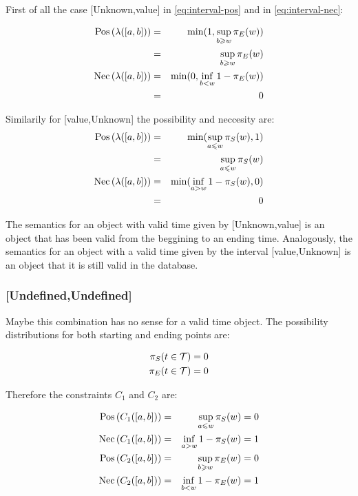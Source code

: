 First of all the case [Unknown,value] in \eqref{eq:interval-pos} and in \eqref{eq:interval-nec}:

\begin{eqnarray}
\operatorname{Pos}\left(\lambda([a,b])\right)&=&\min (1,\sup_{b\geqslant w}\pi_{E}(w))\\
 &=& \sup_{b\geqslant w}\pi_{E}(w)\\
\operatorname{Nec}\left(\lambda([a,b])\right)&=&\min (0,\inf_{b<w}1-\pi_{E}(w))\\
&=& 0
\end{eqnarray}

Similarily for [value,Unknown] the possibility and neccesity are:
\begin{eqnarray}
\operatorname{Pos}\left(\lambda([a,b])\right)&=&\min (\sup_{a\leqslant w}\pi_{S}(w),1)\\
 &=& \sup_{a\leqslant w}\pi_{S}(w)\\
\operatorname{Nec}\left(\lambda([a,b])\right)&=&\min (\inf_{a>w}1-\pi_{S}(w),0)\\
&=& 0
\end{eqnarray}

The semantics for an object with valid time given by [Unknown,value] is an object that has been valid from the beggining to an ending time. Analogously, the semantics for an object with a valid time given by the interval [value,Unknown] is an object that it is still valid in the database. 


\subsubsection{[Undefined,Undefined]}
Maybe this combination has no sense for a valid time object. The possibility distributions for both starting and ending points are:

\begin{eqnarray}
\pi_{S}(t \in \mathcal{T}) = 0\\
\pi_{E}(t \in \mathcal{T}) = 0
\end{eqnarray}

Therefore the constraints $C_1$ and $C_2$ are:

\begin{eqnarray}
\operatorname{Pos}\left(C_1([a,b])\right) &=& \sup_{a\leqslant w}\pi_{S}(w) = 0\\
\operatorname{Nec}\left(C_1([a,b])\right) &=& \inf_{a>w}1-\pi_{S}(w) = 1\\
\operatorname{Pos}\left(C_2([a,b])\right) &=& \sup_{b\geqslant w}\pi_{E}(w)=0\\
\operatorname{Nec}\left(C_2([a,b])\right) &=& \inf_{b<w}1-\pi_{E}(w)=1
\end{eqnarray}

